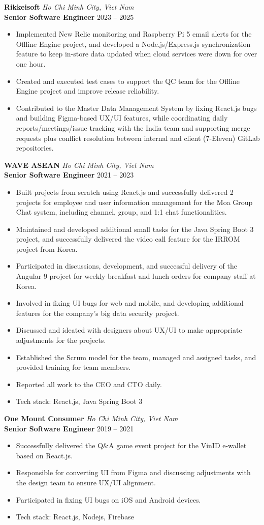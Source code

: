\documentclass[letterpaper,10pt]{article}
\newcommand{\resumeSubheading}[4]{
  \vspace{-1pt}\item
  \textbf{\large\color{accent} #1} \hfill \textit{\color{muted}#2} \\
  \textbf{#3} \hfill {#4}
}
\newcommand{\resumeItem}[1]{
  \item\small{#1\vspace{-2pt}}
}
\newcommand{\resumeItemListStart}{\begin{itemize}[leftmargin=*, label=\textcolor{black}{\textendash}]}
\newcommand{\resumeItemListEnd}{\end{itemize}\vspace{-4pt}}
\begin{document}
  \resumeSubheading
    {Rikkeisoft}{Ho Chi Minh City, Viet Nam}
    {Senior Software Engineer}{2023 -- 2025}
  \resumeItemListStart
    \resumeItem{Implemented New Relic monitoring and Raspberry Pi 5 email alerts for the Offline Engine project, and developed a Node.js/Express.js synchronization feature to keep in-store data updated when cloud services were down for over one hour.}
    \resumeItem{Created and executed test cases to support the QC team for the Offline Engine project and improve release reliability.}
    \resumeItem{Contributed to the Master Data Management System by fixing React.js bugs and building Figma-based UX/UI features, while coordinating daily reports/meetings/issue tracking with the India team and supporting merge requests plus conflict resolution between internal and client (7-Eleven) GitLab repositories.}
  \resumeItemListEnd
  
  \resumeSubheading
    {WAVE ASEAN}{Ho Chi Minh City, Viet Nam}
    {Senior Software Engineer}{2021 -- 2023}
  \resumeItemListStart
  \resumeItem{Built projects from scratch using React.js and successfully delivered 2 projects for employee and user information management for the Moa Group Chat system, including channel, group, and 1:1 chat functionalities.}
  \resumeItem{Maintained and developed additional small tasks for the Java Spring Boot 3 project, and successfully delivered the video call feature for the IRROM project from Korea.}
  \resumeItem{Participated in discussions, development, and successful delivery of the Angular 9 project for weekly breakfast and lunch orders for company staff at Korea.}
  \resumeItem{Involved in fixing UI bugs for web and mobile, and developing additional features for the company's big data security project.}
  \resumeItem{Discussed and ideated with designers about UX/UI to make appropriate adjustments for the projects.}
  \resumeItem{Established the Scrum model for the team, managed and assigned tasks, and provided training for team members.}
  \resumeItem{Reported all work to the CEO and CTO daily.}
  \resumeItem{Tech stack: React.js, Java Spring Boot 3}
  \resumeItemListEnd
 
  \resumeSubheading
    {One Mount Consumer}{Ho Chi Minh City, Viet Nam}
    {Senior Software Engineer}{2019 -- 2021}
  \resumeItemListStart
  \resumeItem{Successfully delivered the Q\&A game event project for the VinID e-wallet based on React.js.}
  \resumeItem{Responsible for converting UI from Figma and discussing adjustments with the design team to ensure UX/UI alignment.}
  \resumeItem{Participated in fixing UI bugs on iOS and Android devices.}
  \resumeItem{Tech stack: React.js, Nodejs, Firebase}
  \resumeItemListEnd
  
\end{document}
